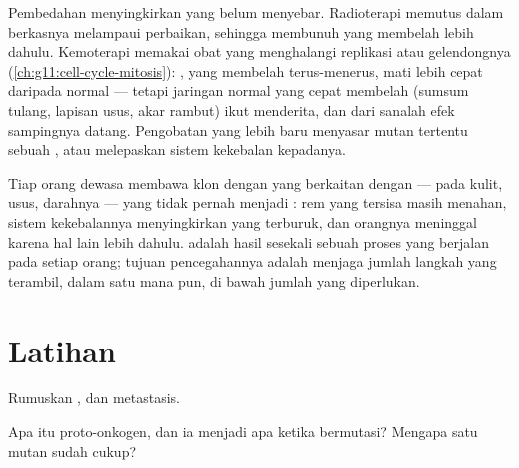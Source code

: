 \begin{example}\label{ex:g11:cancer:treatments}
Pembedahan menyingkirkan  yang belum menyebar. Radioterapi
memutus   dalam berkasnya melampaui perbaikan, sehingga membunuh
 yang membelah lebih dahulu. Kemoterapi memakai obat yang
menghalangi replikasi atau gelendongnya
(\cref{ch:g11:cell-cycle-mitosis}):  , yang membelah
terus-menerus, mati lebih cepat daripada  normal --- tetapi jaringan
normal yang cepat membelah (sumsum tulang, lapisan usus, akar rambut)
ikut menderita, dan dari sanalah efek sampingnya datang. Pengobatan
yang lebih baru menyasar  mutan tertentu sebuah , atau
melepaskan sistem kekebalan kepadanya.
\end{example}

\begin{remark}\label{rem:g11:cancer:everyone}
Tiap orang dewasa membawa klon  dengan  yang berkaitan dengan
 --- pada kulit, usus, darahnya --- yang tidak pernah menjadi
: rem yang tersisa masih menahan, sistem kekebalannya
menyingkirkan yang terburuk, dan orangnya meninggal karena hal lain
lebih dahulu.  adalah hasil sesekali sebuah proses yang berjalan
pada setiap orang; tujuan pencegahannya adalah menjaga jumlah langkah
yang terambil, dalam satu  mana pun, di bawah jumlah yang diperlukan.
\end{remark}

\section{Latihan}

\begin{exercise}[$\star$]\label{exo:g11:cancer:1}
Rumuskan ,  dan metastasis.
\end{exercise}

\begin{exercise}[$\star$]\label{exo:g11:cancer:2}
Apa itu proto-onkogen, dan ia menjadi apa ketika bermutasi? Mengapa
satu  mutan sudah cukup?
\end{exercise}

